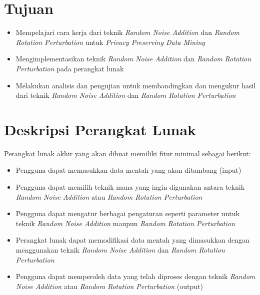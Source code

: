 \documentclass[a4paper,twoside]{article}
\begin{document}
\section{Tujuan}
\begin{itemize}
	\item Mempelajari cara kerja dari teknik \textit{Random Noise Addition} dan \textit{Random Rotation Perturbation} untuk \textit{Privacy Preserving Data Mining}
	\item Mengimplementasikan teknik \textit{Random Noise Addition} dan \textit{Random Rotation Perturbation} pada perangkat lunak
	\item Melakukan analisis dan pengujian untuk membandingkan dan mengukur hasil dari teknik \textit{Random Noise Addition} dan \textit{Random Rotation Perturbation}
\end{itemize}

\section{Deskripsi Perangkat Lunak}
Perangkat lunak akhir yang akan dibuat memiliki fitur minimal sebagai berikut:
\begin{itemize}
	\item Pengguna dapat memasukkan data mentah yang akan ditambang (input)
	\item Pengguna dapat memilih teknik mana yang ingin digunakan antara teknik \textit{Random Noise Addition} atau \textit{Random Rotation Perturbation}
	\item Pengguna dapat mengatur berbagai pengaturan seperti parameter untuk teknik \textit{Random Noise Addition} maupun \textit{Random Rotation Perturbation}
	\item Perangkat lunak dapat memodifikasi data mentah yang dimasukkan dengan menggunakan teknik \textit{Random Noise Addition} dan \textit{Random Rotation Perturbation}
	\item Pengguna dapat memperoleh data yang telah diproses dengan teknik \textit{Random Noise Addition} atau \textit{Random Rotation Perturbation} (output)
\end{itemize}
\end{document}
